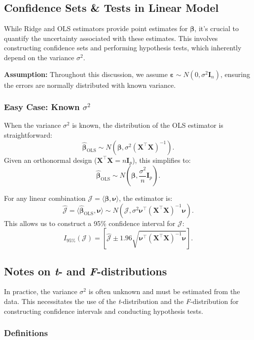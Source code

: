 \documentclass[open=any, 11pt,paper=A4]{scrreprt}
\begin{document}
\subsection*{Confidence Sets \& Tests in Linear Model}

While Ridge and OLS estimators provide point estimates for \(\bm{\beta}\), it's crucial to quantify the uncertainty associated with these estimates. This involves constructing confidence sets and performing hypothesis tests, which inherently depend on the variance \(\sigma^2\).

\textbf{Assumption:} Throughout this discussion, we assume \(\bm{\varepsilon} \sim N(0, \sigma^2 \bm{I}_n)\), ensuring the errors are normally distributed with known variance.

\subsubsection*{Easy Case: Known \(\sigma^2\)}

When the variance \(\sigma^2\) is known, the distribution of the OLS estimator is straightforward:
\[
\hat{\bm{\beta}}_{\text{OLS}} \sim N(\bm{\beta}, \sigma^2 (\bm{X}^\top \bm{X})^{-1}).
\]
Given an orthonormal design (\(\bm{X}^\top \bm{X} = n \bm{I}_p\)), this simplifies to:
\[
\hat{\bm{\beta}}_{\text{OLS}} \sim N\left(\bm{\beta}, \frac{\sigma^2}{n} \bm{I}_p\right).
\]

For any linear combination \(\mathcal{J} = \langle \bm{\beta}, \bm{\nu} \rangle\), the estimator is:
\[
\hat{\mathcal{J}} = \langle \hat{\bm{\beta}}_{\text{OLS}}, \bm{\nu} \rangle \sim N\left(\mathcal{J}, \sigma^2 \bm{\nu}^\top (\bm{X}^\top \bm{X})^{-1} \bm{\nu}\right).
\]
This allows us to construct a 95\% confidence interval for \(\mathcal{J}\):
\[
I_{95\%}(\mathcal{J}) = \left[ \hat{\mathcal{J}} \pm 1.96 \sqrt{\bm{\nu}^\top (\bm{X}^\top \bm{X})^{-1} \bm{\nu}} \right].
\]

\subsection*{Notes on \textit{t}- and \textit{F}-distributions}

In practice, the variance \(\sigma^2\) is often unknown and must be estimated from the data. This necessitates the use of the \textit{t}-distribution and the \textit{F}-distribution for constructing confidence intervals and conducting hypothesis tests.

\subsubsection*{Definitions}
\end{document}
